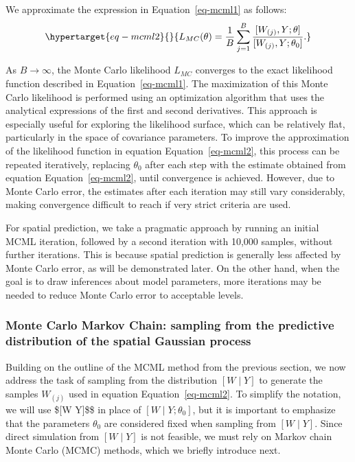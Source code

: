 \documentclass[
  letterpaper,
]{krantz}
\begin{document}
We approximate the expression in Equation~\ref{eq-mcml1} as follows:
\begin{equation}\protect\hypertarget{eq-mcml2}{}{
L_{MC}(\theta) = \frac{1}{B} \sum_{j=1}^B \frac{[W_{(j)}, Y; \theta]}{[W_{(j)}, Y; \theta_0]}.
}\label{eq-mcml2}\end{equation}

As \(B \rightarrow \infty\), the Monte Carlo likelihood \(L_{MC}\)
converges to the exact likelihood function described in
Equation~\ref{eq-mcml1}. The maximization of this Monte Carlo likelihood
is performed using an optimization algorithm that uses the analytical
expressions of the first and second derivatives. This approach is
especially useful for exploring the likelihood surface, which can be
relatively flat, particularly in the space of covariance parameters. To
improve the approximation of the likelihood function in equation
Equation~\ref{eq-mcml2}, this process can be repeated iteratively,
replacing \(\theta_0\) after each step with the estimate obtained from
equation Equation~\ref{eq-mcml2}, until convergence is achieved.
However, due to Monte Carlo error, the estimates after each iteration
may still vary considerably, making convergence difficult to reach if
very strict criteria are used.

For spatial prediction, we take a pragmatic approach by running an
initial MCML iteration, followed by a second iteration with 10,000
samples, without further iterations. This is because spatial prediction
is generally less affected by Monte Carlo error, as will be demonstrated
later. On the other hand, when the goal is to draw inferences about
model parameters, more iterations may be needed to reduce Monte Carlo
error to acceptable levels.

\hypertarget{sec-mcmc-mala}{%
\subsubsection{Monte Carlo Markov Chain: sampling from the predictive
distribution of the spatial Gaussian process}\label{sec-mcmc-mala}}

Building on the outline of the MCML method from the previous section, we
now address the task of sampling from the distribution \([W \mid Y]\) to
generate the samples \(W_{(j)}\) used in equation
Equation~\ref{eq-mcml2}. To simplify the notation, we will use \${[}W
\mid Y{]}\$\$ in place of \([W \mid Y; \theta_0]\), but it is important
to emphasize that the parameters \(\theta_0\) are considered fixed when
sampling from \([W \mid Y]\). Since direct simulation from
\([W \mid Y]\) is not feasible, we must rely on Markov chain Monte Carlo
(MCMC) methods, which we briefly introduce next.
\end{document}
